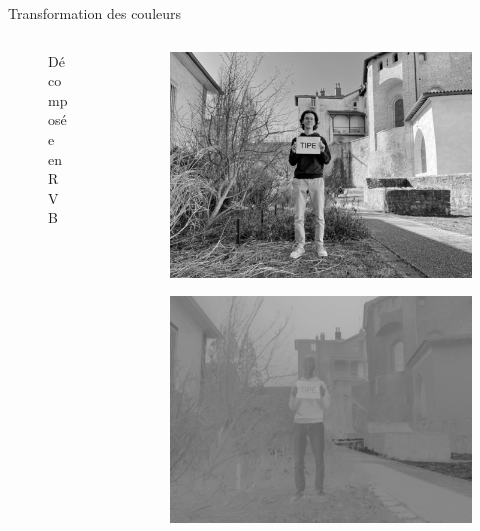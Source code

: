 \documentclass[xcolor=dvipsnames]{beamer}
\begin{document}
\begin{frame}{Transformation des couleurs}
\begin{columns}
\begin{column}{0.3\textwidth}
\begin{figure}
                \caption{\centering Décomposée \\ en R V B}
            \end{figure}
        \end{column}

        \begin{column}{0.3\textwidth}
            \vspace{-15pt}
            \begin{figure}
                \centering
                \includegraphics[width=.8\linewidth]{luminance.jpg}
            \end{figure}
            \vspace{-15pt}
            \begin{figure}
                \centering
                \includegraphics[width=.8\linewidth]{chrominance_bleu.jpg}
            \end{figure}
            \vspace{-15pt}
            \begin{figure}
                \centering

\end{figure}
\end{column}
\end{columns}
\end{frame}
\end{document}
